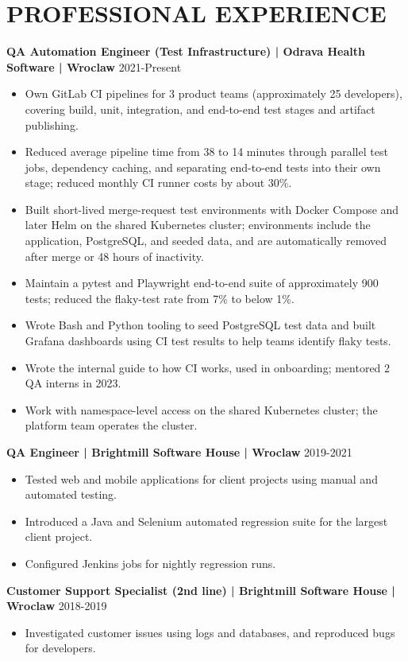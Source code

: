 \documentclass[11pt,a4paper]{article}
\begin{document}
\section*{PROFESSIONAL EXPERIENCE}
\textbf{QA Automation Engineer (Test Infrastructure) | Odrava Health Software | Wroclaw} \hfill 2021-Present
\begin{itemize}
\item Own GitLab CI pipelines for 3 product teams (approximately 25 developers), covering build, unit, integration, and end-to-end test stages and artifact publishing.
\item Reduced average pipeline time from 38 to 14 minutes through parallel test jobs, dependency caching, and separating end-to-end tests into their own stage; reduced monthly CI runner costs by about 30\%.
\item Built short-lived merge-request test environments with Docker Compose and later Helm on the shared Kubernetes cluster; environments include the application, PostgreSQL, and seeded data, and are automatically removed after merge or 48 hours of inactivity.
\item Maintain a pytest and Playwright end-to-end suite of approximately 900 tests; reduced the flaky-test rate from 7\% to below 1\%.
\item Wrote Bash and Python tooling to seed PostgreSQL test data and built Grafana dashboards using CI test results to help teams identify flaky tests.
\item Wrote the internal guide to how CI works, used in onboarding; mentored 2 QA interns in 2023.
\item Work with namespace-level access on the shared Kubernetes cluster; the platform team operates the cluster.
\end{itemize}

\textbf{QA Engineer | Brightmill Software House | Wroclaw} \hfill 2019-2021
\begin{itemize}
\item Tested web and mobile applications for client projects using manual and automated testing.
\item Introduced a Java and Selenium automated regression suite for the largest client project.
\item Configured Jenkins jobs for nightly regression runs.
\end{itemize}

\textbf{Customer Support Specialist (2nd line) | Brightmill Software House | Wroclaw} \hfill 2018-2019
\begin{itemize}
\item Investigated customer issues using logs and databases, and reproduced bugs for developers.
\end{itemize}
\end{document}
